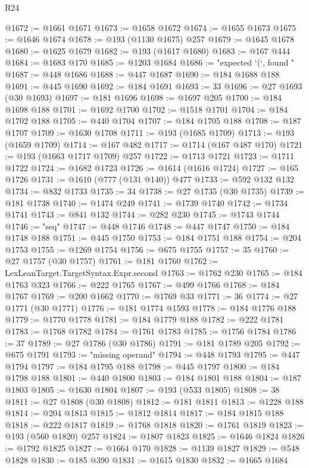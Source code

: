 \begin{lexlean}{R24}
\begin{coremodule}
@1672 := @1661 @1671
@1673 := @1658 @1672
@1674 := @1655 @1673
@1675 := @1646 @1674
@1678 := @193 (@1130 @1675) @257
@1679 := @1645 @1678
@1680 := @1625 @1679
@1682 := @193 (@1617 @1680)
@1683 := @167 @444
@1684 := @1683 @170
@1685 := @1203 @1684
@1686 := "expected `(`, found "
@1687 := @448 @1686
@1688 := @447 @1687
@1690 := @184 @1688 @188
@1691 := @445 @1690
@1692 := @184 @1691
@1693 := 33
@1696 := @27 @1693 (@30 @1693)
@1697 := @181 @1696
@1698 := @1697 @205
@1700 := @184 @1698 @188
@1701 := @1692 @1700
@1702 := @1518 @1701
@1704 := @184 @1702 @188
@1705 := @440 @1704
@1707 := @184 @1705 @188
@1708 := @187 @1707
@1709 := @1630 @1708
@1711 := @193 (@1685 @1709)
@1713 := @193 (@1659 @1709)
@1714 := @167 @482
@1717 := @1714 (@167 @487 @170)
@1721 := @193 (@1663 @1717 @1709) @257
@1722 := @1713 @1721
@1723 := @1711 @1722
@1724 := @1682 @1723
@1726 := @1614 (@1616 @1724)
@1727 := @165 @1726
@1731 := @1610 (@777 (@131 @140)) @477
@1733 := @592 @132 @132
@1734 := @832 @1733
@1735 := 34
@1738 := @27 @1735 (@30 @1735)
@1739 := @181 @1738
@1740 := @1474 @249
@1741 := @1739 @1740
@1742 := @1734 @1741
@1743 := @841 @132
@1744 := @282 @230
@1745 := @1743 @1744
@1746 := "seq"
@1747 := @448 @1746
@1748 := @447 @1747
@1750 := @184 @1748 @188
@1751 := @445 @1750
@1753 := @184 @1751 @188
@1754 := @204 @1753
@1755 := @1269 @1754
@1756 := @675 @1755
@1757 := 35
@1760 := @27 @1757 (@30 @1757)
@1761 := @181 @1760
@1762 := LexLeanTarget.TargetSyntax.Expr.second
@1763 := @1762 @230
@1765 := @184 @1763 @323
@1766 := @222 @1765
@1767 := @499 @1766
@1768 := @184 @1767
@1769 := @200 @1662
@1770 := @1769 @33
@1771 := 36
@1774 := @27 @1771 (@30 @1771)
@1776 := @181 @1774 @1593
@1778 := @184 @1776 @188
@1779 := @1770 @1778
@1781 := @184 @1779 @188
@1782 := @222 @1781
@1783 := @1768 @1782
@1784 := @1761 @1783
@1785 := @1756 @1784
@1786 := 37
@1789 := @27 @1786 (@30 @1786)
@1791 := @181 @1789 @205
@1792 := @675 @1791
@1793 := "missing operand"
@1794 := @448 @1793
@1795 := @447 @1794
@1797 := @184 @1795 @188
@1798 := @445 @1797
@1800 := @184 @1798 @188
@1801 := @440 @1800
@1803 := @184 @1801 @188
@1804 := @187 @1803
@1805 := @1630 @1804
@1807 := @193 (@533 @1805)
@1808 := 38
@1811 := @27 @1808 (@30 @1808)
@1812 := @181 @1811
@1813 := @1228 @188
@1814 := @204 @1813
@1815 := @1812 @1814
@1817 := @184 @1815 @188
@1818 := @222 @1817
@1819 := @1768 @1818
@1820 := @1761 @1819
@1823 := @193 (@560 @1820) @257
@1824 := @1807 @1823
@1825 := @1646 @1824
@1826 := @1792 @1825
@1827 := @1664 @170
@1828 := @1139 @1827
@1829 := @548 @1828
@1830 := @185 @390
@1831 := @1615 @1830
@1832 := @1665 @1684

\end{coremodule}
\end{lexlean}
